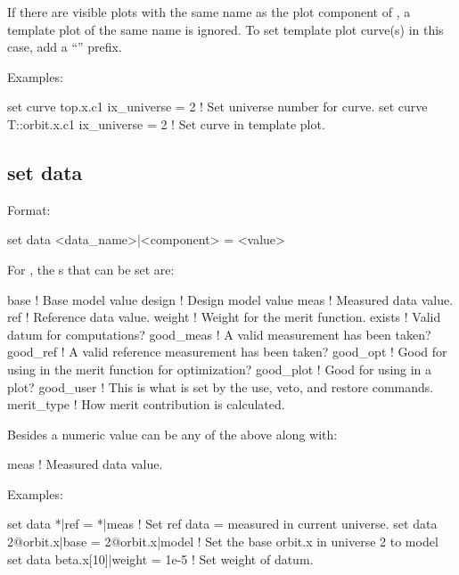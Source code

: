 {{If there are visible plots with the same name as the plot component of , a template plot
of the same name is ignored. To set template plot curve(s) in this case, add a ``'' prefix.

Examples:
\begin{example}
  set curve top.x.c1 ix_universe = 2       ! Set universe number for curve.
  set curve T::orbit.x.c1 ix_universe = 2  ! Set curve in template plot.
\end{example}


\subsection{set data}
\label{s:set.data}

Format:
\begin{example}
  set data <data_name>|<component> = <value>
\end{example}

For , the s that can be set are:
\begin{example}
  base        ! Base model value
  design      ! Design model value
  meas        ! Measured data value.
  ref         ! Reference data value.
  weight      ! Weight for the merit function.
  exists      ! Valid datum for computations?
  good_meas   ! A valid measurement has been taken?
  good_ref    ! A valid reference measurement has been taken?
  good_opt    ! Good for using in the merit function for optimization?
  good_plot   ! Good for using in a plot?
  good_user   ! This is what is set by the use, veto, and restore commands.
  merit_type  ! How merit contribution is calculated.
\end{example}
Besides a numeric value  can be any of the above along with:
\begin{example}
  meas        ! Measured data value.
\end{example}

Examples:
\begin{example}
  set data *|ref = *|meas            ! Set ref data = measured in current universe.
  set data 2@orbit.x|base = 2@orbit.x|model 
                                     ! Set the base orbit.x in universe 2 to model
  set data beta.x[10]|weight = 1e-5  ! Set weight of datum.
\end{example}


}}
